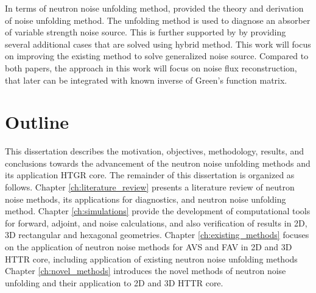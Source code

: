 In terms of neutron noise unfolding method, \cite{demaziereIdentificationLocalizationAbsorbers2005} provided the theory and derivation of noise unfolding method. The unfolding method is used to diagnose an absorber of variable strength noise source. This is further supported by \cite{hosseiniNoiseSourceReconstruction2014} by providing several additional cases that are solved using hybrid method. This work will focus on improving the existing method to solve generalized noise source. Compared to both papers, the approach in this work will focus on noise flux reconstruction, that later can be integrated with known inverse of Green’s function matrix.

\section{Outline}

This dissertation describes the motivation, objectives, methodology, results, and conclusions towards the advancement of the neutron noise unfolding methods and its application HTGR core.
The remainder of this dissertation is organized as follows.
Chapter \ref{ch:literature_review} presents a literature review of neutron noise methods, its applications for diagnostics, and neutron noise unfolding method.
Chapter \ref{ch:simulations} provide the development of computational tools for forward, adjoint, and noise calculations, and also verification of results in 2D, 3D rectangular and hexagonal geometries.
Chapter \ref{ch:existing_methods} focuses on the application of neutron noise methods for AVS and FAV in 2D and 3D HTTR core, including application of existing neutron noise unfolding methods
Chapter \ref{ch:novel_methods} introduces the novel methods of neutron noise unfolding and their application to 2D and 3D HTTR core.

% 
% 
% 
% 
